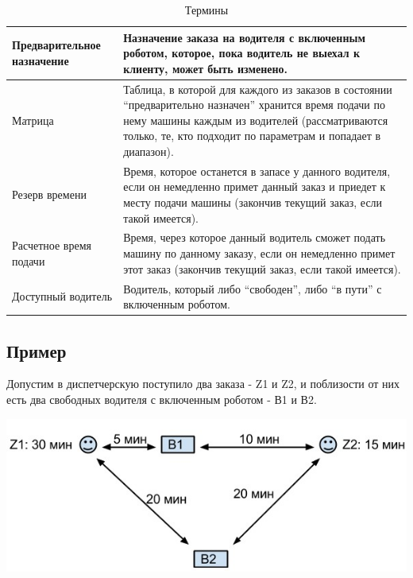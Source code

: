 		\begin{table}[htb]
	        \begin{center}
	        \caption{Термины}
	        \label{appendices_termins}
	        \setlength{\extrarowheight}{2mm}
	        \begin{tabular}{|p{6cm}|p{9cm}|}
	           
	           \hline Предварительное назначение & Назначение заказа на водителя с включенным роботом, которое, пока водитель не выехал к клиенту, может быть изменено.\\ [2mm]

	           \hline Матрица & Таблица, в которой для каждого из заказов в состоянии “предварительно назначен” хранится время подачи по нему машины каждым из водителей (рассматриваются только, те, кто подходит по параметрам и попадает в диапазон).\\ [2mm]

	           \hline Резерв времени & Время, которое останется в запасе у данного водителя, если он немедленно примет данный заказ и приедет к месту подачи машины (закончив текущий заказ, если такой имеется).\\ [2mm]

	           \hline Расчетное время подачи & Время, через которое данный водитель сможет подать машину по данному заказу, если он немедленно примет этот заказ (закончив текущий заказ, если такой имеется).\\ [2mm]

	           \hline Доступный водитель & Водитель, который либо “свободен”, либо “в пути” с включенным роботом.\\ [2mm]    

	           \hline
	        \end{tabular}
	        \end{center}
      	\end{table}

    \subsection{Пример}

    	Допустим в диспетчерскую поступило два заказа - Z1 и Z2, и поблизости от них есть два свободных водителя с включенным роботом - В1 и В2.

    	\includegraphics[width=\textwidth]{images/appendices/appendix_example}

